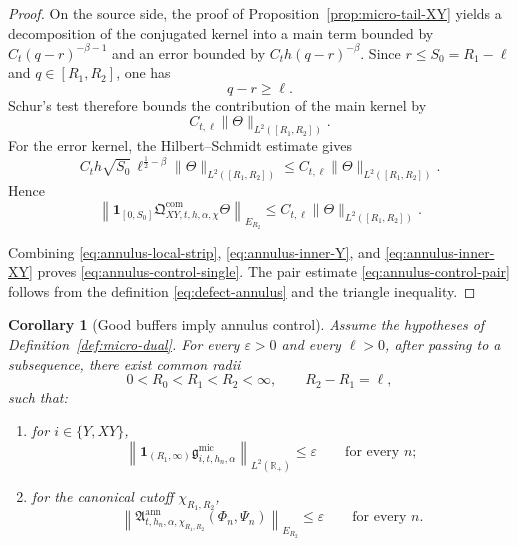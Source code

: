 \documentclass[11pt,a4paper]{amsart}
\theoremstyle{plain}
\newtheorem{corollary}[theorem]{Corollary}
\theoremstyle{definition}
\theoremstyle{remark}
\newcommand{\R}{\mathbb{R}}
\newcommand{\one}{\mathbf 1}
\begin{document}
\begin{proof}
On the source side, the proof of Proposition~\ref{prop:micro-tail-XY} yields a decomposition of the
conjugated kernel into a main term bounded by \(C_t(q-r)^{-\beta-1}\) and an error bounded by
\(C_t h(q-r)^{-\beta}\). Since \(r\le S_0=R_1-\ell\) and \(q\in[R_1,R_2]\), one has
\[
q-r\ge \ell.
\]
Schur's test therefore bounds the contribution of the main kernel by
\[
C_{t,\ell}\|\Theta\|_{L^2([R_1,R_2])}.
\]
For the error kernel, the Hilbert--Schmidt estimate gives
\[
C_t h\sqrt{S_0}\,\ell^{\frac12-\beta}\|\Theta\|_{L^2([R_1,R_2])}
\le
C_{t,\ell}\|\Theta\|_{L^2([R_1,R_2])}.
\]
Hence
\begin{equation}\label{eq:annulus-inner-XY}
\left\|
\one_{[0,S_0]}
\mathfrak Q_{XY,t,h,\alpha,\chi}^{\mathrm{com}}\Theta
\right\|_{E_{R_2}}
\le
C_{t,\ell}\|\Theta\|_{L^2([R_1,R_2])}.
\end{equation}

Combining \eqref{eq:annulus-local-strip}, \eqref{eq:annulus-inner-Y}, and
\eqref{eq:annulus-inner-XY} proves \eqref{eq:annulus-control-single}. The pair estimate
\eqref{eq:annulus-control-pair} follows from the definition \eqref{eq:defect-annulus} and the
triangle inequality.
\end{proof}

\begin{corollary}[Good buffers imply annulus control]
\label{cor:annulus-control}
Assume the hypotheses of Definition~\ref{def:micro-dual}. For every \(\varepsilon>0\) and every
\(\ell>0\), after
passing to a subsequence, there exist common radii
\[
0<R_0<R_1<R_2<\infty,
\qquad
R_2-R_1=\ell,
\]
such that:
\begin{enumerate}[label=(\roman*)]
\item for \(i\in\{Y,XY\}\),
\[
\left\|
\one_{(R_1,\infty)}
\mathfrak g_{i,t,h_n,\alpha}^{\mathrm{mic}}
\right\|_{L^2(\R_+)}
\le
\varepsilon
\qquad\text{for every }n;
\]
\item for the canonical cutoff \(\chi_{R_1,R_2}\),
\begin{equation}\label{eq:annulus-control-seq}
\left\|
\mathfrak A_{t,h_n,\alpha,\chi_{R_1,R_2}}^{\mathrm{ann}}(\Phi_n,\Psi_n)
\right\|_{E_{R_2}}
\le
\varepsilon
\qquad\text{for every }n.
\end{equation}
\end{enumerate}
\end{corollary}
\end{document}
